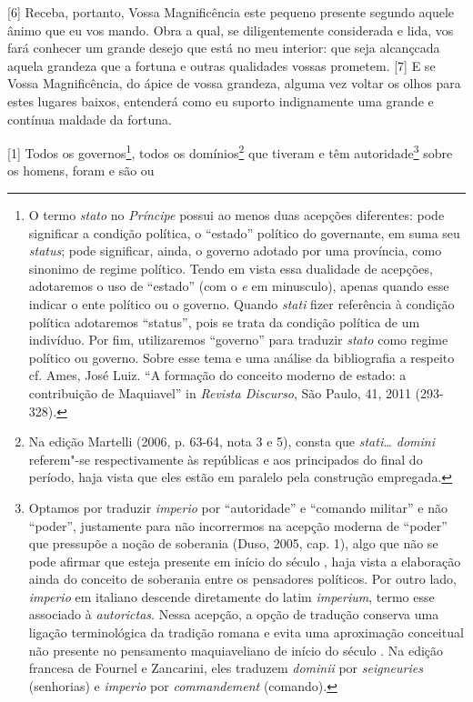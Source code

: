 {[}6{]} Receba, portanto, Vossa Magnificência este pequeno presente
segundo aquele ânimo que eu vos mando. Obra a qual, se diligentemente
considerada e lida, vos fará conhecer um grande desejo que está no meu
interior: que seja alcançcada aquela grandeza que a fortuna e outras
qualidades vossas prometem. {[}7{]} E se Vossa Magnificência, do ápice
de vossa grandeza, alguma vez voltar os olhos para estes lugares baixos,
entenderá como eu suporto indignamente uma grande e contínua maldade da
fortuna.

\setcounter{secnumdepth}{4}



{[}1{]} Todos os governos\footnote{O termo \emph{stato} no
  \emph{Príncipe} possui ao menos duas acepções diferentes: pode
  significar a condição política, o ``estado'' político do governante,
  em suma seu \emph{status}; pode significar, ainda, o governo adotado
  por uma província, como sinonimo de regime político. Tendo em vista
  essa dualidade de acepções, adotaremos o uso de ``estado'' (com o
  \emph{e} em minusculo), apenas quando esse indicar o ente político ou
  o governo. Quando \emph{stati} fizer referência à condição política
  adotaremos ``status'', pois se trata da condição política de um
  indivíduo. Por fim, utilizaremos ``governo'' para traduzir
  \emph{stato} como regime político ou governo. Sobre esse tema e uma
  análise da bibliografia a respeito cf. Ames, José Luiz. ``A formação
  do conceito moderno de estado: a contribuição de Maquiavel'' in
  \emph{Revista Discurso}, São Paulo, 41, 2011 (293-328).}, todos os
domínios\footnote{Na edição Martelli (2006, p. 63-64, nota 3 e 5), consta
  que \emph{stati\ldots{} domini} referem"-se respectivamente às repúblicas e
  aos principados do final do período, haja vista que eles estão em
  paralelo pela construção empregada.} que tiveram e têm
autoridade\footnote{Optamos por traduzir \emph{imperio} por
  ``autoridade'' e ``comando militar'' e não ``poder'', justamente para
  não incorrermos na acepção moderna de ``poder'' que pressupõe a noção
  de soberania (Duso, 2005, cap. 1), algo que não se pode afirmar que
  esteja presente em início do século , haja vista a elaboração ainda
  do conceito de soberania entre os pensadores políticos. Por outro
  lado, \emph{imperio} em italiano descende diretamente do latim
  \emph{imperium}, termo esse associado à \emph{autorictas}. Nessa
  acepção, a opção de tradução conserva uma ligação terminológica da
  tradição romana e evita uma aproximação conceitual não presente no
  pensamento maquiaveliano de início do século . Na edição francesa
  de Fournel e Zancarini, eles traduzem \emph{dominii} por
  \emph{seigneuries} (senhorias) e \emph{imperio} por
  \emph{commandement} (comando).} sobre os homens, foram e são ou
